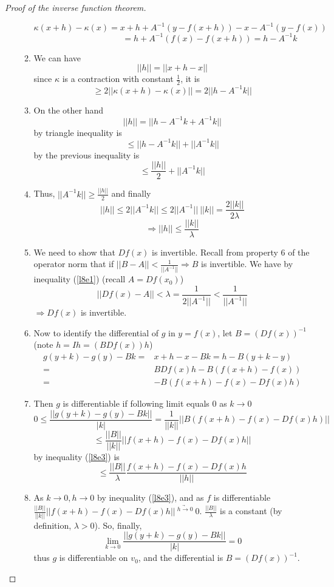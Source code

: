 \begin{proof}[Proof of the inverse function theorem]
\begin{enumerate}[I]
\begin{enumerate}
      $$\kappa(x+h) - \kappa(x) = x + h + A^{-1}(y-f(x+h))-x-A^{-1}(y-f(x))$$
      $$\phantom{\kappa(x+h) - \kappa(x)} =h+A^{-1}(f(x)-f(x+h))=h-A^{-1}k$$
    \item We can have
      $$||h|| = ||x + h - x||$$
      since $\kappa$ is a contraction with constant $\frac{1}{2}$, it is
      $$\geq 2||\kappa(x+h)-\kappa(x)|| = 2||h-A^{-1}k||$$
    \item On the other hand
      $$||h|| = ||h-A^{-1}k + A^{-1}k||$$
      by triangle inequality is
      $$\leq ||h-A^{-1}k|| + ||A^{-1}k||$$
      by the previous inequality is
      $$\leq \frac{||h||}{2}+||A^{-1}k||$$
    \item Thus, $||A^{-1}k|| \geq \frac{||h||}{2}$ and finally
      $$||h|| \leq 2||A^{-1}k|| \leq 2||A^{-1}||\ ||k|| = \frac{2||k||}{2\lambda}$$
      \begin{equation}
        \label{l8e3}
        \Rightarrow ||h|| \leq \frac{||k||}{\lambda}
      \end{equation}
    \item We need to show that $Df(x)$ is invertible. Recall from property 6 of the operator norm that if $||B - A|| < \frac{1}{||A^{-1}||} \Rightarrow B$ is invertible. We have by inequality (\ref{l8e1}) (recall $A = Df(x_0)$)
      $$||Df(x) - A|| < \lambda = \frac{1}{2||A^{-1}||} < \frac{1}{||A^{-1}||}$$
      $\Rightarrow Df(x)$ is invertible.
    \item Now to identify the differential of $g$ in $y=f(x)$, let $B=(Df(x))^{-1}$ (note $h = Ih = (BDf(x))h$)
      \begin{align*}
      	g(y+k) - g(y) - Bk =& x+h-x-Bk = h-B(y+k-y)\\
      	=&BDf(x)h - B(f(x+h) - f(x)) \\=& -B(f(x+h)-f(x)-Df(x)h)
      \end{align*}
    \item Then $g$ is differentiable if following limit equals $0$ as $k \rightarrow 0$
      $$0 \leq \frac{||g(y+k) - g(y) - Bk||}{|k|} = \frac{1}{||k||}||B(f(x+h)-f(x)-Df(x)h)|| $$
      $$\leq \frac{||B||}{||k||}||f(x+h)-f(x)-Df(x)h||$$
      by inequality (\ref{l8e3}) is
      $$\leq \frac{||B||}{\lambda}\frac{f(x+h)-f(x)-Df(x)h}{||h||}$$
    \item As $k\rightarrow 0, h\rightarrow 0$ by inequality (\ref{l8e3}), and as $f$ is differentiable $\frac{||B||}{||k||}||f(x+h)-f(x)-Df(x)h||\ \underrightarrow{^{h\rightarrow 0}}\ 0$. $\frac{||B||}{\lambda}$ is a constant (by definition, $\lambda > 0$).
      So, finally,
      $$\lim_{k\rightarrow 0}\frac{||g(y+k) - g(y) - Bk||}{|k|} = 0$$
      thus $g$ is differentiable on $v_0$, and the differential is $B = (Df(x))^{-1}$.
    \end{enumerate}
  \end{enumerate}
\end{proof}

